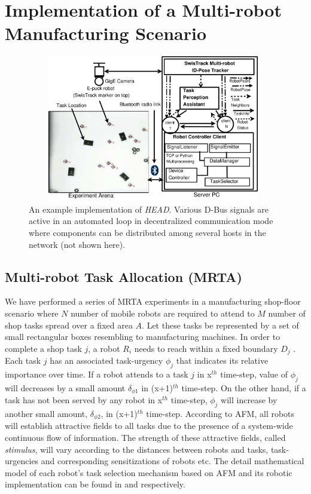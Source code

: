 \documentclass[draft]{ifacconf}
\begin{document}
\section{Implementation of a Multi-robot Manufacturing Scenario}
\label{sec:impl}
\begin{figure}
\begin{center}
\includegraphics[width=11cm,height=6.4cm]{./dia-files/RIL-Expt-Setup3}    %
\caption{An example implementation of {\em HEAD}. Various D-Bus signals are active in an automated loop in decentralized communication mode where components can be distributed among several hosts in the network (not shown here).} 
\label{fig:setup}
\end{center}
\end{figure}
\subsection{Multi-robot Task Allocation (MRTA)}
We have performed a series of MRTA experiments in a manufacturing shop-floor scenario where $N$ number of mobile robots are required to attend to $M$ number of shop tasks spread over a fixed area $A$. Let these tasks be represented by a set of small rectangular boxes resembling to manufacturing machines. In order to complete a shop task $j$, a robot $R_i$ needs to reach within a fixed boundary $D_{j}$ . Each task $j$ has an associated task-urgency $\phi_j$ that indicates its relative importance over time. If a robot attends to a task $j$ in x$^{th}$ time-step, value of $\phi_j$ will decreases by a small amount $\delta_{\phi 1}$ in (x+1)$^{th}$ time-step. On the other hand, if a task has not been served by any robot in x$^{th}$ time-step, $\phi_j$ will increase by another small amount, $\delta_{\phi 2}$, in (x+1)$^{th}$ time-step. According to AFM, all robots will establish attractive fields to all tasks due to the presence of a system-wide continuous flow of information. The strength of these attractive fields, called {\em stimulus}, will vary according to the distances between robots and tasks, task-urgencies and corresponding sensitizations of robots etc. The detail mathematical model of each robot's task selection mechanism based on AFM and its robotic implementation can be found in \cite{Arcaute+2008} and \cite{Sarker+2010ants} respectively.
\end{document}

